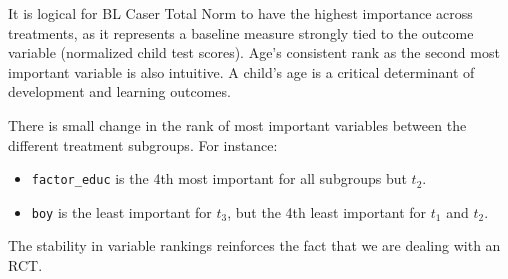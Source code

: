 \documentclass{article}
\begin{document}
It is logical for BL Caser Total Norm to have the highest importance across treatments, as it represents a baseline measure strongly tied to the outcome variable (normalized child test scores). Age's consistent rank as the second most important variable is also intuitive. A child's age is a critical determinant of development and learning outcomes.

There is small change in the rank of most important variables between the different treatment subgroups. For instance:
\begin{itemize}
  \item \texttt{factor\_educ} is the 4th most important for all subgroups but $t_2$.
  \item \texttt{boy} is the least important for $t_3$, but the 4th least important for $t_1$ and $t_2$.
\end{itemize}

The stability in variable rankings reinforces the fact that we are dealing with an RCT.
\end{document}
